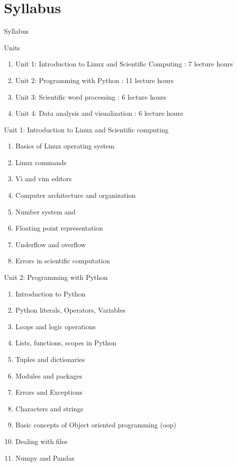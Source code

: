 \documentclass[aspectratio=169]{beamer}
\begin{document}
\section{Syllabus}

\begin{frame}{Syllabus}
\begin{block}{Units}
\end{block}

\begin{enumerate}
    \item Unit 1: Introduction to Linux and Scientific Computing : 7 lecture hours
    \item Unit 2: Programming with Python : 11 lecture hours
    \item Unit 3: Scientific word processing : 6 lecture hours
    \item Unit 4: Data analysis and visualization : 6 lecture hours
\end{enumerate}
    
\end{frame}

\begin{frame}{Unit 1: Introduction to Linux and Scientific computing}
\begin{enumerate}
    \item Basics of Linux operating system 
    \item Linux commands 
    \item Vi and vim editors
    \item Computer architecture and organization 
    \item Number system and 
    \item Floating point representation 
    \item Underflow and overflow
    \item Errors in scientific computation 
\end{enumerate}

\end{frame}

\begin{frame}{Unit 2: Programming with Python}
\begin{enumerate}
    \item Introduction to Python
    \item Python literals, Operators, Variables 
    \item Loops and logic operations 
    \item Lists, functions, scopes in Python
    \item Tuples and dictionaries 
    \item Modules and packages 
    \item Errors and Exceptions 
    \item Characters and strings 
    \item Basic concepts of Object oriented programming (oop)
    \item Dealing with files 
    \item Numpy and Pandas 
\end{enumerate}
\end{frame}
\end{document}
